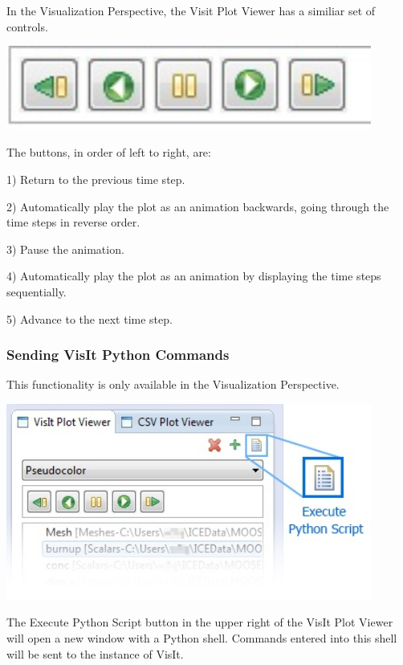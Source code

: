 \documentclass{article}
\begin{document}
In the Visualization Perspective, the Visit Plot Viewer has a similiar set of
controls.

\begin{center}
\includegraphics[width=12cm]{images/VizPerspectiveTimeControls}
\end{center}

The buttons, in order of left to right, are:

1) Return to the previous time step.

2) Automatically play the plot as an animation backwards, going through the time
steps in reverse order.

3) Pause the animation.

4) Automatically play the plot as an animation by displaying the time steps
sequentially.

5) Advance to the next time step. 

\subsubsection{Sending VisIt Python Commands}

This functionality is only available in the Visualization Perspective.

\begin{center}
\includegraphics[width=12cm]{images/PythonScriptButton}
\end{center}

The Execute Python Script button in the upper right of the VisIt Plot Viewer
will open a new window with a Python shell. Commands entered into this shell
will be sent to the instance of VisIt. 
\end{document}
